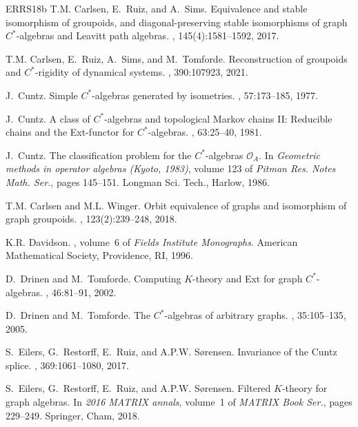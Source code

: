 \documentclass[12pt]{amsbook}%
\theoremstyle{defin}
\theoremstyle{remark}
\numberwithin{equation}{chapter}
\numberwithin{theor}{section}
\begin{document}
\begin{thebibliography}{ERRS18b}
T.M. Carlsen, E.~Ruiz, and A.~Sims.
\newblock Equivalence and stable isomorphism of groupoids, and
  diagonal-preserving stable isomorphisms of graph {$C^*$}-algebras and
  {L}eavitt path algebras.
, 145(4):1581--1592, 2017.

T.M. Carlsen, E.~Ruiz, A.~Sims, and M.~Tomforde.
\newblock Reconstruction of groupoids and {$C^*$}-rigidity of dynamical
  systems.
, 390:107923, 2021.

J.~Cuntz.
\newblock Simple {$C^*$}-algebras generated by isometries.
, 57:173--185, 1977.

J.~Cuntz.
\newblock A class of {$C^*$}-algebras and topological {Markov} chains {II}:
  Reducible chains and the {E}xt-functor for {$C^*$}-algebras.
, 63:25--40, 1981.

J.~Cuntz.
\newblock The classification problem for the {$C^*$}-algebras {${\mathcal
  O}_A$}.
\newblock In {\em Geometric methods in operator algebras ({K}yoto, 1983)},
  volume 123 of {\em Pitman Res. Notes Math. Ser.}, pages 145--151. Longman
  Sci. Tech., Harlow, 1986.

T.M. Carlsen and M.L. Winger.
\newblock Orbit equivalence of graphs and isomorphism of graph groupoids.
, 123(2):239--248, 2018.

K.R. Davidson.
, volume~6 of {\em Fields Institute
  Monographs}.
\newblock American Mathematical Society, Providence, RI, 1996.

D.~Drinen and M.~Tomforde.
\newblock Computing {$K$}-theory and {Ext} for graph {$C^*$}-algebras.
, 46:81--91, 2002.

D.~Drinen and M.~Tomforde.
\newblock The {$C^*$}-algebras of arbitrary graphs.
, 35:105--135, 2005.

S.~Eilers, G.~Restorff, E.~Ruiz, and A.P.W. S\o{}rensen.
\newblock Invariance of the {C}untz splice.
, 369:1061--1080, 2017.

S.~Eilers, G.~Restorff, E.~Ruiz, and A.P.W. S\o{}rensen.
\newblock Filtered {$K$}-theory for graph algebras.
\newblock In {\em 2016 {MATRIX} annals}, volume~1 of {\em MATRIX Book Ser.},
  pages 229--249. Springer, Cham, 2018.


\end{thebibliography}
\end{document}
